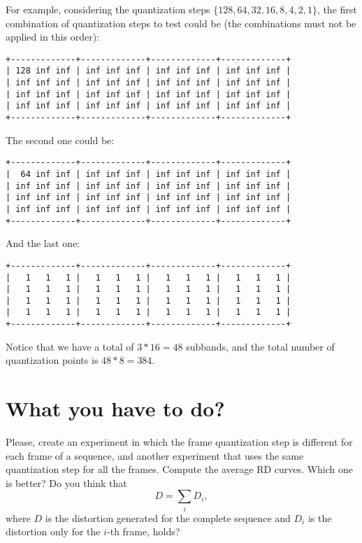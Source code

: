\begin{enumerate}
  For example, considering the quantization steps $\{128, 64, 32, 16,
  8, 4, 2, 1\}$, the first combination of quantization steps to test
  could be (the combinations must not be applied in this order):
\begin{verbatim}
+-------------+-------------+-------------+-------------+
| 128 inf inf | inf inf inf | inf inf inf | inf inf inf |
| inf inf inf | inf inf inf | inf inf inf | inf inf inf | 
| inf inf inf | inf inf inf | inf inf inf | inf inf inf | 
| inf inf inf | inf inf inf | inf inf inf | inf inf inf | 
+-------------+-------------+-------------+-------------+
\end{verbatim}
  The second one could be:
\begin{verbatim}
+-------------+-------------+-------------+-------------+
|  64 inf inf | inf inf inf | inf inf inf | inf inf inf |
| inf inf inf | inf inf inf | inf inf inf | inf inf inf | 
| inf inf inf | inf inf inf | inf inf inf | inf inf inf | 
| inf inf inf | inf inf inf | inf inf inf | inf inf inf | 
+-------------+-------------+-------------+-------------+
\end{verbatim}
  And the last one:
\begin{verbatim}
+-------------+-------------+-------------+-------------+
|   1   1   1 |   1   1   1 |   1   1   1 |   1   1   1 |
|   1   1   1 |   1   1   1 |   1   1   1 |   1   1   1 | 
|   1   1   1 |   1   1   1 |   1   1   1 |   1   1   1 | 
|   1   1   1 |   1   1   1 |   1   1   1 |   1   1   1 | 
+-------------+-------------+-------------+-------------+
\end{verbatim}
\end{enumerate}

Notice that we have a total of $3*16=48$ subbands, and the total
number of quantization points is $48*8=384$.

\section{What you have to do?}

Please, create an experiment in which the frame quantization step is
different for each frame of a sequence, and another experiment that
uses the same quantization step for all the frames. Compute the
average RD curves. Which one is better? Do you think that
\begin{equation*}
  D = \sum_i D_i,
\end{equation*}
where $D$ is the distortion generated for the complete sequence and
$D_i$ is the distortion only for the $i$-th frame, holds?

